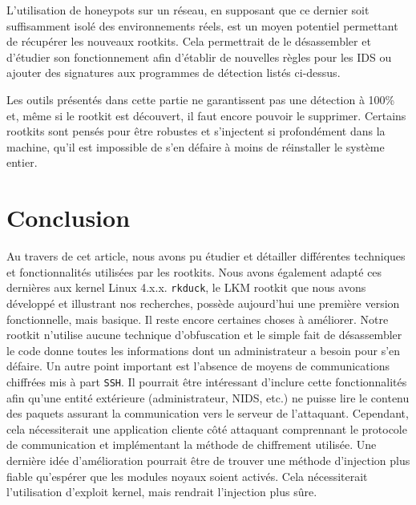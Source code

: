 \documentclass[12pt]{article}
\begin{document}
    L'utilisation de honeypots sur un réseau, en supposant que ce dernier soit suffisamment isolé des environnements réels, est un moyen potentiel permettant de récupérer les nouveaux rootkits. Cela permettrait de le désassembler et d'étudier son fonctionnement afin d'établir de nouvelles règles pour les IDS ou ajouter des signatures aux programmes de détection listés ci-dessus.
   
    Les outils présentés dans cette partie ne garantissent pas une détection à 100\% et, même si le rootkit est découvert, il faut encore pouvoir le supprimer. Certains rootkits sont pensés pour être robustes et s'injectent si profondément dans la machine, qu'il est impossible de s'en défaire à moins de réinstaller le système entier.

\section*{Conclusion}
    
	Au travers de cet article, nous avons pu étudier et détailler différentes techniques et fonctionnalités utilisées par les rootkits. Nous avons également adapté ces dernières aux kernel Linux 4.x.x. \texttt{rkduck}, le LKM rootkit que nous avons développé et illustrant nos recherches, possède aujourd'hui une première version fonctionnelle, mais basique. Il reste encore certaines choses à améliorer.
	Notre rootkit n'utilise aucune technique d'obfuscation et le simple fait de désassembler le code donne toutes les informations dont un administrateur a besoin pour s'en défaire. Un autre point important est l'absence de moyens de communications chiffrées mis à part \texttt{SSH}. Il pourrait être intéressant d'inclure cette fonctionnalités afin qu'une entité extérieure (administrateur, NIDS, etc.) ne puisse lire le contenu des paquets assurant la communication vers le serveur de l'attaquant. Cependant, cela nécessiterait une application cliente côté attaquant comprennant le protocole de communication et implémentant la méthode de chiffrement utilisée. Une dernière idée d'amélioration pourrait être de trouver une méthode d'injection plus fiable qu'espérer que les modules noyaux soient activés. Cela nécessiterait l'utilisation d'exploit kernel, mais rendrait l'injection plus sûre.
\end{document}
